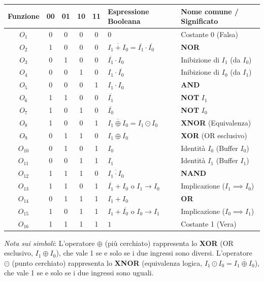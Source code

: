 \begin{fitcenter}
\small
\begin{tabular}{c|cccc|l|l}
\toprule
\textbf{Funzione} & \textbf{00} & \textbf{01} & \textbf{10} & \textbf{11} & \textbf{Espressione Booleana} & \textbf{Nome comune / Significato} \\
\midrule
$O_1$    & 0 & 0 & 0 & 0 & $0$ & Costante 0 (Falsa) \\
$O_2$    & 1 & 0 & 0 & 0 & $\overline{I_1 + I_0} = \overline{I_1} \cdot \overline{I_0}$ & \textbf{NOR} \\
$O_3$    & 0 & 1 & 0 & 0 & $\overline{I_1} \cdot I_0$ & Inibizione di $I_1$ (da $I_0$) \\
$O_4$    & 0 & 0 & 1 & 0 & $I_1 \cdot \overline{I_0}$ & Inibizione di $I_0$ (da $I_1$) \\
$O_5$    & 0 & 0 & 0 & 1 & $I_1 \cdot I_0$ & \textbf{AND} \\
$O_6$    & 1 & 1 & 0 & 0 & $\overline{I_1}$ & \textbf{NOT} $I_1$ \\
$O_7$    & 1 & 0 & 1 & 0 & $\overline{I_0}$ & \textbf{NOT} $I_0$ \\
$O_8$    & 1 & 0 & 0 & 1 & $\overline{I_1 \oplus I_0} = I_1 \odot I_0$ & \textbf{XNOR} (Equivalenza) \\
$O_9$    & 0 & 1 & 1 & 0 & $I_1 \oplus I_0$ & \textbf{XOR} (OR esclusivo) \\
$O_{10}$ & 0 & 1 & 0 & 1 & $I_0$ & Identità $I_0$ (Buffer $I_0$) \\
$O_{11}$ & 0 & 0 & 1 & 1 & $I_1$ & Identità $I_1$ (Buffer $I_1$) \\
$O_{12}$ & 1 & 1 & 1 & 0 & $\overline{I_1 \cdot I_0}$ & \textbf{NAND} \\
$O_{13}$ & 1 & 1 & 0 & 1 & $\overline{I_1} + I_0$ o $I_1 \rightarrow I_0$ & Implicazione ($I_1 \implies I_0$) \\
$O_{14}$ & 0 & 1 & 1 & 1 & $I_1 + I_0$ & \textbf{OR} \\
$O_{15}$ & 1 & 0 & 1 & 1 & $I_1 + \overline{I_0}$ o $I_0 \rightarrow I_1$ & Implicazione ($I_0 \implies I_1$) \\
$O_{16}$ & 1 & 1 & 1 & 1 & $1$ & Costante 1 (Vera) \\
\bottomrule
\end{tabular}
\end{fitcenter}

\noindent\footnotesize \textit{Nota sui simboli}: 
L'operatore $\oplus$ (più cerchiato) rappresenta lo \textbf{XOR} (OR esclusivo, $I_1 \oplus I_0$), che vale 1 se e solo se i due ingressi sono diversi. 
L'operatore $\odot$ (punto cerchiato) rappresenta lo \textbf{XNOR} (equivalenza logica, $I_1 \odot I_0 = \overline{I_1 \oplus I_0}$), che vale 1 se e solo se i due ingressi sono uguali.

